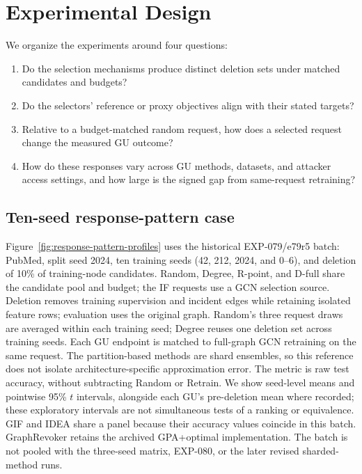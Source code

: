 \section{Experimental Design}
\label{sec:experiments}

We organize the experiments around four questions:
\begin{enumerate}
  \item Do the selection mechanisms produce distinct deletion sets under matched candidates and budgets?
  \item Do the selectors' reference or proxy objectives align with their stated targets?
  \item Relative to a budget-matched random request, how does a selected request change the measured GU outcome?
  \item How do these responses vary across GU methods, datasets, and attacker access settings, and how large is the signed gap from same-request retraining?
\end{enumerate}

\subsection{Ten-seed response-pattern case}
Figure~\ref{fig:response-pattern-profiles} uses the historical EXP-079/e79r5 batch: PubMed, split seed 2024, ten training seeds (42, 212, 2024, and 0--6), and deletion of 10\% of training-node candidates. Random, Degree, R-point, and D-full share the candidate pool and budget; the IF requests use a GCN selection source. Deletion removes training supervision and incident edges while retaining isolated feature rows; evaluation uses the original graph. Random's three request draws are averaged within each training seed; Degree reuses one deletion set across training seeds. Each GU endpoint is matched to full-graph GCN retraining on the same request. The partition-based methods are shard ensembles, so this reference does not isolate architecture-specific approximation error. The metric is raw test accuracy, without subtracting Random or Retrain. We show seed-level means and pointwise 95\% $t$ intervals, alongside each GU's pre-deletion mean where recorded; these exploratory intervals are not simultaneous tests of a ranking or equivalence. GIF and IDEA share a panel because their accuracy values coincide in this batch. GraphRevoker retains the archived GPA+optimal implementation. The batch is not pooled with the three-seed matrix, EXP-080, or the later revised sharded-method runs.

